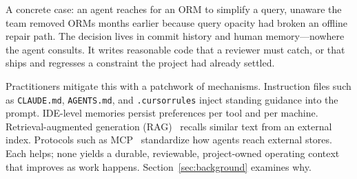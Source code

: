 \documentclass[sigconf,review,anonymous]{acmart}
\begin{document}
A concrete case: an agent reaches for an ORM to simplify a query, unaware the team removed ORMs months earlier because query opacity had broken an offline repair path. The decision lives in commit history and human memory---nowhere the agent consults. It writes reasonable code that a reviewer must catch, or that ships and regresses a constraint the project had already settled.

Practitioners mitigate this with a patchwork of mechanisms. Instruction files such as \texttt{CLAUDE.md}, \texttt{AGENTS.md}, and \texttt{.cursorrules} inject standing guidance into the prompt. IDE-level memories persist preferences per tool and per machine. Retrieval-augmented generation (RAG)~\cite{lewis2020rag} recalls similar text from an external index. Protocols such as MCP~\cite{mcp2024} standardize how agents reach external stores. Each helps; none yields a durable, reviewable, project-owned operating context that improves as work happens. Section~\ref{sec:background} examines why.
\end{document}
